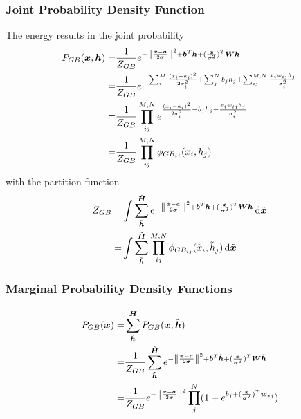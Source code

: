 \documentclass[twoside,english]{uiofysmaster}
\newcommand*\dif{\mathop{}\!\mathrm{d}}
\DeclarePairedDelimiter{\norm}{\lVert}{\rVert}
\begin{document}
\subsubsection{Joint Probability Density Function}
The energy results in the joint probability
\begin{align}
	P_{GB} (\bm{x}, \bm{h}) =& \frac{1}{Z_{GB}} e^{-\norm*{\frac{\bm{x} -\bm{a}}{2\bm{\sigma}}}^2 + \bm{b}^T \bm{h} 
	+ (\frac{\bm{x}}{\bm{\sigma}^2})^T \bm{W}\bm{h}} \nonumber \\
	=& \frac{1}{Z_{GB}} e^{- \sum_i^M \frac{(x_i - a_i)^2}{2\sigma_i^2}
	+ \sum_j^N b_j h_j 
	+\sum_{ij}^{M,N} \frac{x_i w_{ij} h_j}{\sigma_i^2}} \nonumber \\
	=& \frac{1}{Z_{GB}} \prod_{ij}^{M,N} e^{\frac{(x_i - a_i)^2}{2\sigma_i^2}
	- b_j h_j 
	-\frac{x_i w_{ij} h_j}{\sigma_i^2}} \nonumber \\
	=& \frac{1}{Z_{GB}} \prod_{ij}^{M,N} \phi_{GB_{ij}} (x_i, h_j)
\end{align}
with the partition function
\begin{align}
	Z_{GB} =& \int \sum_{\tilde{\bm{h}}}^{\tilde{\bm{H}}} e^{-\norm*{\frac{\tilde{\bm{x}} -\bm{a}}{2\bm{\sigma}}}^2 + \bm{b}^T \tilde{\bm{h}} 
	+ (\frac{\tilde{\bm{x}}}{\bm{\sigma}^2})^T \bm{W}\tilde{\bm{h}}} \dif \tilde{\bm{x}} \nonumber \\
	=& \int \sum_{\tilde{\bm{h}}}^{\tilde{\bm{H}}} \prod_{ij}^{M, N} \phi_{GB_{ij}} (\tilde{x}_i, \tilde{h}_j) \dif \tilde{\bm{x}}
\end{align}


\subsubsection{Marginal Probability Density Functions}
\begin{align}
	P_{GB} (\bm{x}) =& \sum_{\tilde{\bm{h}}}^{\tilde{\bm{H}}} P_{GB} (\bm{x}, \tilde{\bm{h}}) \nonumber \\
	=& \frac{1}{Z_{GB}} \sum_{\tilde{\bm{h}}}^{\tilde{\bm{H}}} 
	e^{-\norm*{\frac{\bm{x} -\bm{a}}{2\bm{\sigma}}}^2 + \bm{b}^T \tilde{\bm{h}} 
	+ (\frac{\bm{x}}{\bm{\sigma}^2})^T \bm{W}\tilde{\bm{h}}} \nonumber \\
	=& \frac{1}{Z_{GB}} e^{-\norm*{\frac{\bm{x} -\bm{a}}{2\bm{\sigma}}}^2}
	\prod_j^N (1 + e^{b_j + (\frac{\bm{x}}{\bm{\sigma}^2})^T \bm{w}_{\ast j}} ) \nonumber \\
\end{align}
\end{document}
